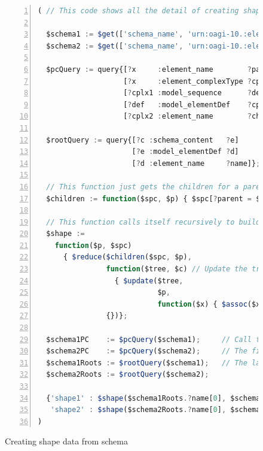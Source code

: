 \documentclass[10pt,letterpaper]{article} %
\begin{document}
\begin{figure}[H]
  \caption{Creating shape data from schema}
  \label{fig:def-of-shape-fn}
\begin{lstlisting}[language=JavaScript,numberstyle=\scriptsize,basicstyle=\ttfamily\scriptsize,numbers=left,stepnumber=1,breaklines=true]
( // This code shows all the detail of creating shapes for $llmMatch.

  $schema1 := $get(['schema_name', 'urn:oagi-10.:elena.2023-07-02.ProcessInvoice-BC_1_v2'], ['schema_content']);
  $schema2 := $get(['schema_name', 'urn:oagi-10.:elena.2023-07-02.ProcessInvoice-BC_2_v2'], ['schema_content']);

  $pcQuery := query{[?x     :element_name        ?parent] // pc = 'parent/child'
                    [?x     :element_complexType ?cplx1]
                    [?cplx1 :model_sequence      ?def]
                    [?def   :model_elementDef    ?cplx2]
                    [?cplx2 :element_name        ?child]};

  $rootQuery := query{[?c :schema_content   ?e]
                      [?e :model_elementDef ?d]
                      [?d :element_name     ?name]};

  // This function just gets the children for a parent.
  $children := function($spc, $p) { $spc[?parent = $p].?child };

  // This function calls itself recursively to build the schema shape, starting from the root.
  $shape :=
    function($p, $spc)
      { $reduce($children($spc, $p),
                function($tree, $c) // Update the tree.
                  { $update($tree,
                            $p,
                            function($x) { $assoc($x, $c, $lookup($shape($c, $spc), $c) or '<data>')}) },
                {})};

  $schema1PC    := $pcQuery($schema1);     // Call the two queries with the two schema.
  $schema2PC    := $pcQuery($schema2);     // The first two return binding sets for {?parent x ?child y}
  $schema1Roots := $rootQuery($schema1);   // The last two return binding sets for {?name} (of a root).
  $schema2Roots := $rootQuery($schema2);

  {'shape1' : $shape($schema1Roots.?name[0], $schema1PC),
   'shape2' : $shape($schema2Roots.?name[0], $schema2PC)}
)
\end{lstlisting}
\end{figure} \vspace{-3em}
\end{document}

